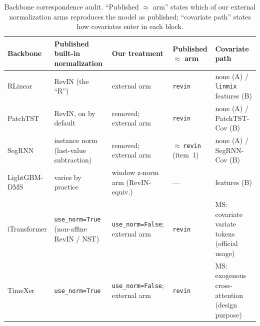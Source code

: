 \begin{table}[t]
\centering
\caption{Backbone correspondence audit. ``Published $\approx$ arm'' states
which of our external normalization arms reproduces the model as published;
``covariate path'' states how covariates enter in each block.}
\label{tab:audit}
\scriptsize
\setlength{\tabcolsep}{4pt}
\begin{tabular}{@{}p{2.5cm}p{2.5cm}p{2.4cm}p{1.9cm}p{2.9cm}@{}}
\toprule
Backbone & Published built-in normalization & Our treatment & Published $\approx$ arm & Covariate path \\
\midrule
RLinear \citep{li2023rlinear} & RevIN (the ``R'') & external arm & \texttt{revin} & none (A) / \texttt{linmix} features (B) \\
PatchTST \citep{nie2023patchtst} & RevIN, on by default & removed; external arm & \texttt{revin} & none (A) / PatchTST-Cov (B) \\
SegRNN \citep{lin2023segrnn} & instance norm (last-value subtraction) & removed; external arm & $\approx$\,\texttt{revin} (item~1) & none (A) / SegRNN-Cov (B) \\
LightGBM-DMS \citep{ke2017lightgbm} & varies by practice & window z-norm arm (RevIN-equiv.) & --- & features (B) \\
iTransformer \citep{liu2024itransformer} & \texttt{use\_norm=True} (non-affine RevIN / NST) & \texttt{use\_norm=False}; external arm & \texttt{revin} & MS: covariate variate tokens (official usage) \\
TimeXer \citep{wang2024timexer} & \texttt{use\_norm=True} & \texttt{use\_norm=False}; external arm & \texttt{revin} & MS: exogenous cross-attention (design purpose) \\
\bottomrule
\end{tabular}
\end{table}

\begin{table}[t]
\centering
\caption{Comparison-block structure. Blocks are internally uniform and never
compared to each other numerically.}
\label{tab:blocks}
\end{table}

